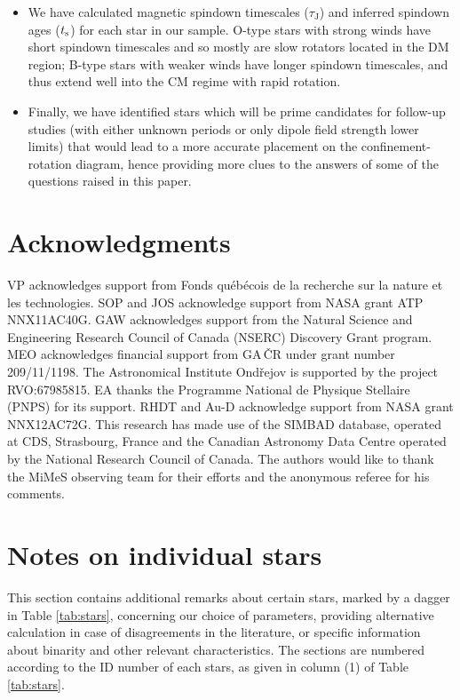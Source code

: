 \documentclass[useAMS,usenatbib]{mn2e}
\newcommand{\tauj}{\tau_\mathrm{J}}
\begin{document}
\begin{itemize}
\item We have calculated magnetic spindown timescales ($\tauj$) and inferred spindown ages ($t_{\rm s}$) for each star in our sample. O-type stars with strong winds have short spindown timescales and so mostly are slow rotators located in the DM region; B-type stars with weaker winds have longer spindown timescales, and thus extend well into the CM regime with rapid rotation.

\item Finally, we have identified stars which will be prime candidates for follow-up studies (with either unknown periods or only dipole field strength lower limits) that would lead to a more accurate placement on the confinement-rotation diagram, hence providing more clues to the answers of some of the questions raised in this paper. 

\end{itemize}
 
 
 
\section*{Acknowledgments}
  VP acknowledges support from Fonds qu\'eb\'ecois de la recherche sur la nature et les technologies.
SOP and JOS acknowledge support from NASA grant ATP NNX11AC40G.
GAW acknowledges support from the Natural Science and Engineering Research Council of Canada (NSERC) Discovery Grant program.
MEO acknowledges financial support from GA\,\v{C}R under grant number 209/11/1198. The Astronomical Institute Ond\v{r}ejov 
is supported by the project RVO:67985815.
EA thanks the Programme National de Physique Stellaire (PNPS) for its support.
RHDT  and Au-D acknowledge support from NASA grant NNX12AC72G.
   This research has made use of the SIMBAD database, operated at CDS, Strasbourg, France and the Canadian Astronomy Data Centre operated by the National Research Council of Canada.
The authors would like to thank the MiMeS observing team for their efforts and the anonymous referee for his comments.



 

\appendix


\section{Notes on individual stars}
\label{sec:notes}


This section contains additional remarks about certain stars, marked by a dagger in Table \ref{tab:stars}, concerning our choice of parameters, providing alternative calculation in case of disagreements in the literature, or specific information about binarity and other relevant characteristics. 
The sections are numbered according to the ID number of each stars, as given in column (1) of Table \ref{tab:stars}.
\end{document}

